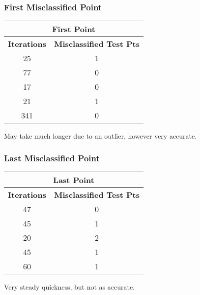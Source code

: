 \documentclass{article}
\begin{document}
\subsubsection*{First Misclassified Point}
\begin{center}
\begin{tabular}{|c|c|}
	\hline
	\multicolumn{2}{|c|}{\textbf{First Point}} \\\hline
	\textbf{Iterations} & \textbf{Misclassified Test Pts} \\\hline
	25 & 1 \\
	77 & 0\\
	17 & 0 \\
	21 & 1\\
	341 & 0\\
	\hline
\end{tabular}
\end{center}
May take much longer due to an outlier, however very accurate.

\subsubsection*{Last Misclassified Point}
\begin{center}
\begin{tabular}{|c|c|}
	\hline
	\multicolumn{2}{|c|}{\textbf{Last Point}} \\\hline
	\textbf{Iterations} & \textbf{Misclassified Test Pts} \\\hline
	47 & 0 \\
	45 & 1\\
	20 & 2 \\
	45 & 1\\
	60 & 1\\
	\hline
\end{tabular}
\end{center}
Very steady quickness, but not as accurate.

\end{document}
